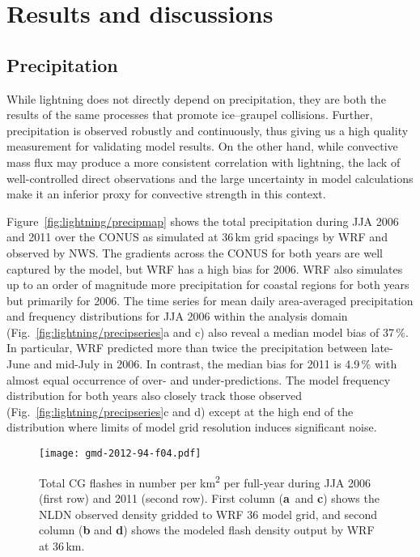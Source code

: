 \section{Results and discussions}\label{sec:lightning/results}

\subsection{Precipitation}\label{ssec:lightning/precip}

While lightning does not directly depend on precipitation, they are both the
results of the same processes that promote ice--graupel collisions. Further,
precipitation is observed robustly and continuously, thus giving us a high
quality measurement for validating model results. On the other hand, while
convective mass flux may produce a more consistent correlation with
lightning, the lack of well-controlled direct observations and the large
uncertainty in model calculations make it an inferior proxy for convective
strength in this context.

Figure~\ref{fig:lightning/precipmap} shows the total precipitation during JJA 2006 and
2011 over the CONUS as simulated at 36\,\unit{km} grid spacings by WRF and
observed by NWS. The gradients across the CONUS for both years are well
captured by the model, but WRF has a high bias for 2006. WRF also simulates
up to an order of magnitude more precipitation for coastal regions for both
years but primarily for 2006. The time series for mean daily area-averaged
precipitation and frequency distributions for JJA 2006 within the analysis
domain (Fig.~\ref{fig:lightning/precipseries}a and c) also reveal a median model bias
of 37\,{\%}. In particular, WRF predicted more than twice the precipitation
between late-June and mid-July in 2006. In contrast, the median bias for 2011
is 4.9\,{\%} with almost equal occurrence of over- and under-predictions. The
model frequency distribution for both years also closely track those observed
(Fig.~\ref{fig:lightning/precipseries}c and d) except at the high end of the
distribution where limits of model grid resolution induces significant noise.

\begin{figure*}[t]
      \texttt{[image: gmd-2012-94-f04.pdf]}
      \caption{Total CG flashes in number per \unit{km^2} per
          full-year during JJA 2006 (first row) and 2011 (second
          row). First column (\textbf{a}~and \textbf{c}) shows the NLDN observed
          density gridded to WRF 36 model grid, and second column
          (\textbf{b} and \textbf{d}) shows the modeled flash density output by
          WRF at 36\,\unit{km}.}
      \label{fig:lightning/cgmap}
\end{figure*}


